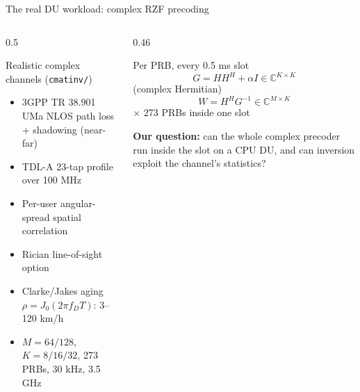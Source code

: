 \documentclass[aspectratio=169,11pt,xcolor=table]{beamer}
\begin{document}
\begin{frame}{The real DU workload: complex RZF precoding}
  \begin{columns}[T]
    \begin{column}{0.5\textwidth}
      \begin{block}{Realistic complex channels (\texttt{cmatinv/})}
        \begin{itemize}\small
          \item 3GPP TR 38.901 UMa NLOS path loss + shadowing (near-far)
          \item TDL-A 23-tap profile over 100 MHz
          \item Per-user angular-spread spatial correlation
          \item Rician line-of-sight option
          \item Clarke/Jakes aging $\rho = J_0(2\pi f_D T)$: 3--120 km/h
          \item $M = 64/128$, $K = 8/16/32$, 273 PRBs, 30 kHz, 3.5 GHz
        \end{itemize}
      \end{block}
    \end{column}
    \begin{column}{0.46\textwidth}
      \begin{exampleblock}{Per PRB, every 0.5 ms slot}
        \[
          G = HH^H + \alpha I \in \mathbb{C}^{K\times K}
        \]
        \vspace{-2mm}\centering (complex Hermitian)
        \[
          W = H^H G^{-1} \in \mathbb{C}^{M\times K}
        \]
        \centering $\times$ 273 PRBs inside one slot
      \end{exampleblock}
      \textbf{Our question:} can the whole complex precoder run inside the slot on a CPU DU,
      and can inversion exploit the channel's statistics?
    \end{column}
  \end{columns}
\end{frame}
\end{document}
